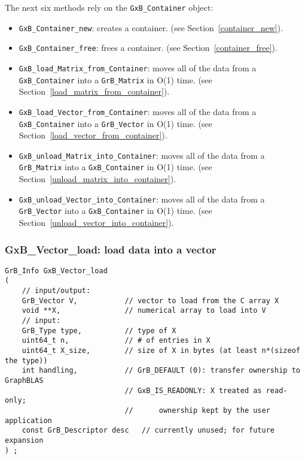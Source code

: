 The next six methods rely on the \verb'GxB_Container' object:

\begin{itemize}
\item \verb'GxB_Container_new': creates a container.
    (see Section~\ref{container_new}).

\item \verb'GxB_Container_free': frees a container.
    (see Section~\ref{container_free}).

\item \verb'GxB_load_Matrix_from_Container': moves all of the data from a
    \verb'GxB_Container' into a \verb'GrB_Matrix' in O(1) time.
    (see Section~\ref{load_matrix_from_container}).

\item \verb'GxB_load_Vector_from_Container': moves all of the data from a
    \verb'GxB_Container' into a \verb'GrB_Vector' in O(1) time.
    (see Section~\ref{load_vector_from_container}).

\item \verb'GxB_unload_Matrix_into_Container': moves all of the data from
    a \verb'GrB_Matrix' into a \verb'GxB_Container' in O(1) time.
    (see Section~\ref{unload_matrix_into_container}).

\item \verb'GxB_unload_Vector_into_Container': moves all of the data from
    a \verb'GrB_Vector' into a \verb'GxB_Container' in O(1) time.
    (see Section~\ref{unload_vector_into_container}).

\end{itemize}

\subsubsection{{\sf GxB\_Vector\_load:} load data into a vector}
\label{vector_load}

\begin{mdframed}[userdefinedwidth=6in]
{\footnotesize
\begin{verbatim}
GrB_Info GxB_Vector_load
(
    // input/output:
    GrB_Vector V,           // vector to load from the C array X
    void **X,               // numerical array to load into V
    // input:
    GrB_Type type,          // type of X
    uint64_t n,             // # of entries in X
    uint64_t X_size,        // size of X in bytes (at least n*(sizeof the type))
    int handling,           // GrB_DEFAULT (0): transfer ownership to GraphBLAS
                            // GxB_IS_READONLY: X treated as read-only;
                            //      ownership kept by the user application
    const GrB_Descriptor desc   // currently unused; for future expansion
) ;
\end{verbatim}
} \end{mdframed}

